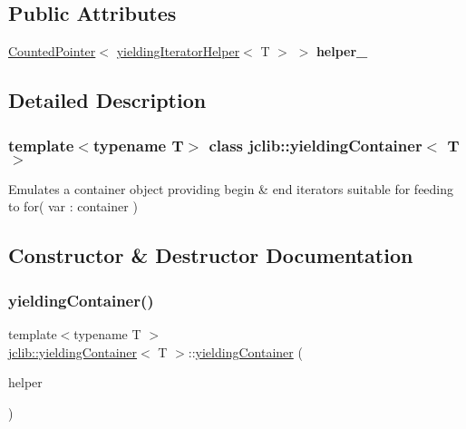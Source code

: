 \subsection*{Public Attributes}
\begin{DoxyCompactItemize}
\item 
\mbox{\label{classjclib_1_1yieldingContainer_afb04032b6ed32789c92a8c2b32c9efc1}} 
\hyperlink{classjclib_1_1CountedPointer}{Counted\+Pointer}$<$ \hyperlink{classjclib_1_1yieldingIteratorHelper}{yielding\+Iterator\+Helper}$<$ T $>$ $>$ {\bfseries helper\+\_\+}
\end{DoxyCompactItemize}


\subsection{Detailed Description}
\subsubsection*{template$<$typename T$>$\newline
class jclib\+::yielding\+Container$<$ T $>$}

Emulates a container object providing begin \& end iterators suitable for feeding to for( var \+: container ) 

\subsection{Constructor \& Destructor Documentation}
\mbox{\label{classjclib_1_1yieldingContainer_a2be1354629759fbe753a23361ddff48b}} 
\subsubsection{\texorpdfstring{yielding\+Container()}{yieldingContainer()}\hspace{0.1cm}{\footnotesize\ttfamily [1/2]}}
{\footnotesize\ttfamily template$<$typename T $>$ \\
\hyperlink{classjclib_1_1yieldingContainer}{jclib\+::yielding\+Container}$<$ T $>$\+::\hyperlink{classjclib_1_1yieldingContainer}{yielding\+Container} (\begin{DoxyParamCaption}\item[{\hyperlink{classjclib_1_1yieldingIteratorHelper}{yielding\+Iterator\+Helper}$<$ T $>$ $\ast$}]{helper }\end{DoxyParamCaption})\hspace{0.3cm}{\ttfamily [inline]}}

